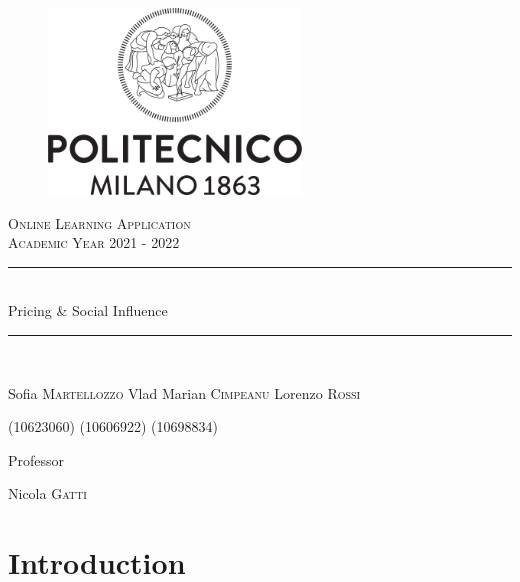 \documentclass{article}
\begin{document}
\begin{titlepage}
      \centering
      \begin{figure}
            \begin{center}
                  \includegraphics[width=0.6\textwidth]{img/logo_polimi.png}
            \end{center}
      \end{figure}
      \vfill
      {\scshape\LARGE Online Learning Application\\Academic Year 2021 - 2022 \par}
      
      
      \vfill
      \newcommand{\HRule}{\rule{\linewidth}{0.3mm}}
      \centering
      \HRule \\[0.4cm]
      \huge  Pricing \& Social Influence\\%
      \HRule \\
      \vspace{1cm}
      {\Large Sofia \textsc{Martellozzo} \quad  Vlad Marian \textsc{Cimpeanu}  \quad  Lorenzo \textsc{Rossi}\par}
      {\Large(10623060) \quad (10606922) \quad (10698834) \par}
      \vfill
      {\large Professor\par
          Nicola \textsc{Gatti}}
\end{titlepage}


\newpage
\renewcommand\contentsname{Contents}
\tableofcontents

\newpage

\section*{Introduction}



\newpage
\end{document}

